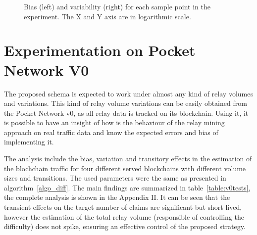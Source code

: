\documentclass[runningheads]{llncs}
\begin{document}
\begin{figure}
    \centering
    \qquad
    \caption{Bias (left) and variability (right)  for each sample point in the experiment. The X and Y axis are in logarithmic scale.}%
\end{figure}


\section{Experimentation on Pocket Network V0}

The proposed schema is expected to work under almost any kind of relay volumes and variations. This kind of relay volume variations can be easily obtained from the Pocket Network v0, as all relay data is tracked on its blockchain. Using it, it is possible to have an insight of how is the behaviour of the relay mining approach on real traffic data and know the expected errors and bias of implementing it. 

The analysis include the bias, variation and transitory effects in the estimation of the blochchain traffic for four different served blockchains with different volume sizes and transitions. The used parameters were the same as presented in algorithm~\ref{algo_diff}. The main findings are summarized in table~\ref{table:v0tests}, the complete analysis is shown in the Appendix II. It can be seen that the transient effects on the target number of claims are significant but short lived, however the estimation of the total relay volume (responsible of controlling the difficulty) does not spike, ensuring an effective control of the proposed strategy.
\end{document}
